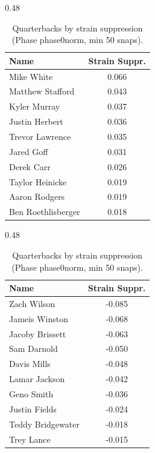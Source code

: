 \begin{table}[h!]
\centering
\begin{subtable}{0.48\textwidth}
\centering
\footnotesize
\begin{tabular}{lc}
\toprule
Name & Strain Suppr. \\
\midrule
Mike White & 0.066 \\
Matthew Stafford & 0.043 \\
Kyler Murray & 0.037 \\
Justin Herbert & 0.036 \\
Trevor Lawrence & 0.035 \\
Jared Goff & 0.031 \\
Derek Carr & 0.026 \\
Taylor Heinicke & 0.019 \\
Aaron Rodgers & 0.019 \\
Ben Roethlisberger & 0.018 \\
\bottomrule
\end{tabular}
\caption{Most strain-suppressing}
\end{subtable}
\hfill
\begin{subtable}{0.48\textwidth}
\centering
\footnotesize
\begin{tabular}{lc}
\toprule
Name & Strain Suppr. \\
\midrule
Zach Wilson & -0.085 \\
Jameis Winston & -0.068 \\
Jacoby Brissett & -0.063 \\
Sam Darnold & -0.050 \\
Davis Mills & -0.048 \\
Lamar Jackson & -0.042 \\
Geno Smith & -0.036 \\
Justin Fields & -0.024 \\
Teddy Bridgewater & -0.018 \\
Trey Lance & -0.015 \\
\bottomrule
\end{tabular}
\caption{Least strain-suppressing}
\end{subtable}
\hfill
\caption{Quarterbacks by strain suppression (Phase phase0norm, min 50 snaps).}
\label{tab:qb_supp_phase0norm}
\end{table}
